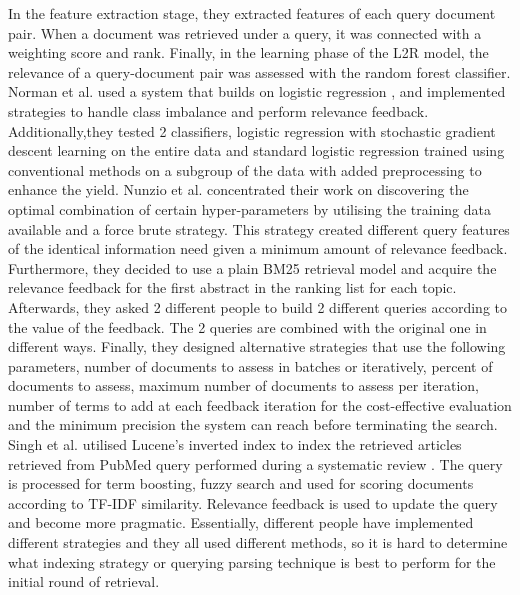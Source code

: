In the feature extraction stage, they extracted features of each query document pair. When a document was retrieved under a query, it was connected with a weighting score and rank. Finally, in the learning phase of the L2R model, the relevance of a query-document pair was assessed with the random forest classifier.
Norman et al. used a system that builds on logistic regression \cite{norman122017limsi}, and implemented strategies to handle class imbalance and perform relevance feedback. Additionally,they tested 2 classifiers, logistic regression with stochastic gradient descent learning on the entire data and standard logistic regression trained using conventional methods on a subgroup of the data with added preprocessing to enhance the yield.
Nunzio et al. \cite{nunzio2017interactive} concentrated their work on discovering the optimal combination of certain hyper-parameters by utilising the training data available and a force brute strategy. This strategy created different query features of the identical information need given a minimum amount of relevance feedback. Furthermore, they decided to use a plain BM25 retrieval model and acquire the relevance feedback for the first abstract in the ranking list for each topic. Afterwards, they asked 2 different people to build 2 different queries according to the value of the feedback. The 2 queries are combined with the original one in different ways. Finally, they designed alternative strategies that use the following parameters, number of documents to assess in batches or iteratively, percent of documents to assess, maximum number of documents to assess per iteration, number of terms to add at each feedback iteration for the cost-effective evaluation and the minimum precision the system can reach before terminating the search.
Singh et al. utilised Lucene's inverted index to index the retrieved articles retrieved from PubMed query performed during a systematic review \cite{singhiiit}.
The query is processed for term boosting, fuzzy search and used for scoring documents according to TF-IDF similarity. Relevance feedback is used to update the query and become more pragmatic.
Essentially, different people have implemented different strategies and they all used different methods, so it is hard to determine what indexing strategy or querying parsing technique is best to perform for the initial round of retrieval.
